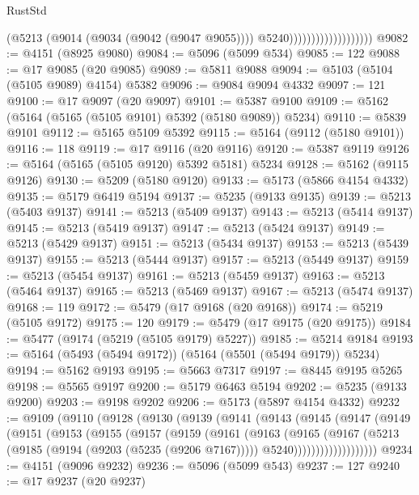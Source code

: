 \begin{lexlean}{RustStd}
\begin{coremodule}
                                        (@5213
                                          (@9014 (@9034 (@9042 (@9047 @9055))))
                                          @5240)))))))))))))))))))
@9082 := @4151 (@8925 @9080)
@9084 := @5096 (@5099 @534)
@9085 := 122
@9088 := @17 @9085 (@20 @9085)
@9089 := @5811 @9088
@9094 := @5103 (@5104 (@5105 @9089) @4154) @5382
@9096 := @9084 @9094 @4332
@9097 := 121
@9100 := @17 @9097 (@20 @9097)
@9101 := @5387 @9100
@9109 := @5162 (@5164 (@5165 (@5105 @9101) @5392 (@5180 @9089)) @5234)
@9110 := @5839 @9101
@9112 := @5165 @5109 @5392
@9115 := @5164 (@9112 (@5180 @9101))
@9116 := 118
@9119 := @17 @9116 (@20 @9116)
@9120 := @5387 @9119
@9126 := @5164 (@5165 (@5105 @9120) @5392 @5181) @5234
@9128 := @5162 (@9115 @9126)
@9130 := @5209 (@5180 @9120)
@9133 := @5173 (@5866 @4154 @4332)
@9135 := @5179 @6419 @5194
@9137 := @5235 (@9133 @9135)
@9139 := @5213 (@5403 @9137)
@9141 := @5213 (@5409 @9137)
@9143 := @5213 (@5414 @9137)
@9145 := @5213 (@5419 @9137)
@9147 := @5213 (@5424 @9137)
@9149 := @5213 (@5429 @9137)
@9151 := @5213 (@5434 @9137)
@9153 := @5213 (@5439 @9137)
@9155 := @5213 (@5444 @9137)
@9157 := @5213 (@5449 @9137)
@9159 := @5213 (@5454 @9137)
@9161 := @5213 (@5459 @9137)
@9163 := @5213 (@5464 @9137)
@9165 := @5213 (@5469 @9137)
@9167 := @5213 (@5474 @9137)
@9168 := 119
@9172 := @5479 (@17 @9168 (@20 @9168))
@9174 := @5219 (@5105 @9172)
@9175 := 120
@9179 := @5479 (@17 @9175 (@20 @9175))
@9184 := @5477 (@9174 (@5219 (@5105 @9179) @5227))
@9185 := @5214 @9184
@9193 := @5164 (@5493 (@5494 @9172)) (@5164 (@5501 (@5494 @9179)) @5234)
@9194 := @5162 @9193
@9195 := @5663 @7317
@9197 := @8445 @9195 @5265
@9198 := @5565 @9197
@9200 := @5179 @6463 @5194
@9202 := @5235 (@9133 @9200)
@9203 := @9198 @9202
@9206 := @5173 (@5897 @4154 @4332)
@9232 := @9109
    (@9110
      (@9128
        (@9130
          (@9139
            (@9141
              (@9143
                (@9145
                  (@9147
                    (@9149
                      (@9151
                        (@9153
                          (@9155
                            (@9157
                              (@9159
                                (@9161
                                  (@9163
                                    (@9165
                                      (@9167
                                        (@5213
                                          (@9185 (@9194 (@9203 (@5235 (@9206 @7167)))))
                                          @5240)))))))))))))))))))
@9234 := @4151 (@9096 @9232)
@9236 := @5096 (@5099 @543)
@9237 := 127
@9240 := @17 @9237 (@20 @9237)

\end{coremodule}
\end{lexlean}
